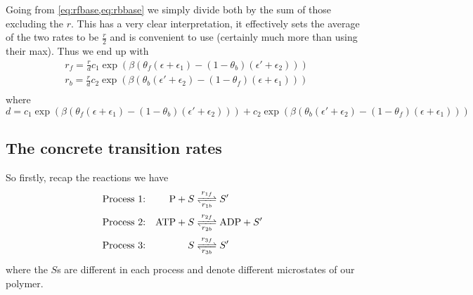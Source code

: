 \documentclass[11pt]{article}
\begin{document}
\begin{tcolorbox}
	Going from \cref{eq:rfbase,eq:rbbase} we simply divide both by the sum of those excluding the $r$.
	This has a very clear interpretation, it effectively sets the average of the two rates to be $\frac{r}{2}$ and is convenient to use (certainly much more than using their max).
	Thus we end up with
	\begin{align}
		 & r_f = \frac{r}{d} c_1 \exp(\beta(\theta_f(\epsilon+\epsilon_1)-(1-\theta_b)(\epsilon'+\epsilon_2))) \\
		 & r_b = \frac{r}{d} c_2 \exp(\beta(\theta_b(\epsilon'+\epsilon_2)-(1-\theta_f)(\epsilon+\epsilon_1))) \\
	\end{align}
	where
	\begin{equation}
		d = c_1 \exp(\beta(\theta_f(\epsilon+\epsilon_1)-(1-\theta_b)(\epsilon'+\epsilon_2))) + c_2 \exp(\beta(\theta_b(\epsilon'+\epsilon_2)-(1-\theta_f)(\epsilon+\epsilon_1)))
	\end{equation}
\end{tcolorbox}

\subsection{The concrete transition rates}
So firstly, recap the reactions we have
\begin{align}
	\text{Process 1:} &  & \ce{P + $S$   & <=>[$r_{1f}$][$r_{1b}$] $S'$}       \\
	\text{Process 2:} &  & \ce{ATP + $S$ & <=>[$r_{2f}$][$r_{2b}$] ADP + $S'$} \\
	\text{Process 3:} &  & \ce{$S$       & <=>[$r_{3f}$][$r_{3b}$] $S'$}
\end{align}
where the $S$s are different in each process and denote different microstates of our polymer.
\end{document}
